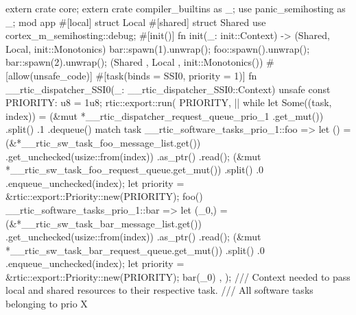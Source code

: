 extern crate core;
extern crate compiler_builtins as _;
use panic_semihosting as _;
mod app {
    #[local]
    struct Local {}
    #[shared]
    struct Shared {}
    use cortex_m_semihosting::debug;
    #[init()]
    fn init(_: init::Context) -> (Shared, Local, init::Monotonics) {
        bar::spawn(1).unwrap();
        foo::spawn().unwrap();
        bar::spawn(2).unwrap();
        (Shared {}, Local {}, init::Monotonics())
    }
    #[allow(unsafe_code)]
    #[task(binds = SSI0, priority = 1)]
    fn __rtic_dispatcher_SSI0(_: __rtic_dispatcher_SSI0::Context) {
        unsafe {
            const PRIORITY: u8 = 1u8;
            rtic::export::run(
                PRIORITY,
                || {
                    while let Some((task, index)) = (&mut *__rtic_dispatcher_request_queue_prio_1
                        .get_mut())
                        .split()
                        .1
                        .dequeue()
                    {
                        match task {
                            __rtic_software_tasks_prio_1::foo => {
                                let () = (&*__rtic_sw_task_foo_message_list.get())
                                    .get_unchecked(usize::from(index))
                                    .as_ptr()
                                    .read();
                                (&mut *__rtic_sw_task_foo_request_queue.get_mut())
                                    .split()
                                    .0
                                    .enqueue_unchecked(index);
                                let priority = &rtic::export::Priority::new(PRIORITY);
                                foo()
                            }
                            __rtic_software_tasks_prio_1::bar => {
                                let (_0,) = (&*__rtic_sw_task_bar_message_list.get())
                                    .get_unchecked(usize::from(index))
                                    .as_ptr()
                                    .read();
                                (&mut *__rtic_sw_task_bar_request_queue.get_mut())
                                    .split()
                                    .0
                                    .enqueue_unchecked(index);
                                let priority = &rtic::export::Priority::new(PRIORITY);
                                bar(_0)
                            }
                        }
                    }
                },
            );
        }
    }
    /// Context needed to pass local and shared resources to their respective task.
    /// All software tasks belonging to prio X
}
